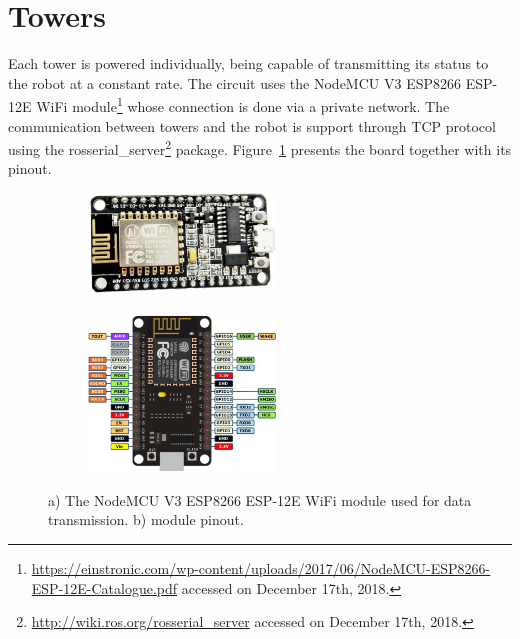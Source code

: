 
\section{Towers}\label{sec:towers}
Each tower is powered individually, being capable of transmitting its status to the robot at a constant rate. The circuit uses the NodeMCU V3 ESP8266 ESP-12E WiFi module\footnote{\url{https://einstronic.com/wp-content/uploads/2017/06/NodeMCU-ESP8266-ESP-12E-Catalogue.pdf} accessed on December 17th, 2018.} whose connection is done via a private network. The communication between towers and the robot is support through TCP protocol using the rosserial\_server\footnote{\url{http://wiki.ros.org/rosserial_server} accessed on December 17th, 2018.} package. Figure~\ref{fig:tower_board} presents the board together with its pinout. 

\begin{figure}[thpb]
  \centering
  \begin{subfigure}[b]{\textwidth}
  	\centering
      \includegraphics[width=5cm]{images/03-foundation/node_mcu}
	\caption{}
  \end{subfigure}
   \qquad 
  \begin{subfigure}[b]{\textwidth}
  \centering
      \includegraphics[width=5cm]{images/03-foundation/node_mcu_pinout}
	\caption{}
  \end{subfigure}
  \caption{a) The NodeMCU V3 ESP8266 ESP-12E WiFi module used for data transmission. b) module pinout.}
  \label{fig:tower_board}
\end{figure}

